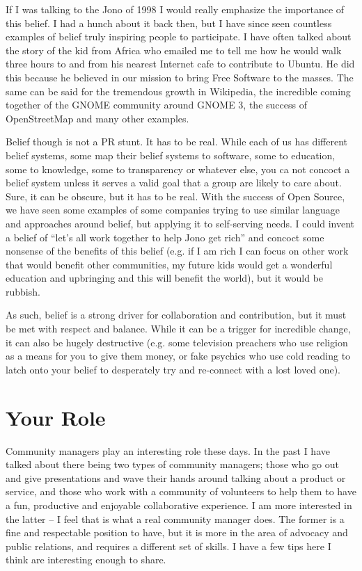 If I was talking to the Jono of 1998 I would really emphasize the importance of
this belief. I had a hunch about it back then, but I have since seen countless
examples of belief truly inspiring people to participate. I have often talked
about the story of the kid from Africa who emailed me to tell me how he would
walk three hours to and from his nearest Internet cafe to contribute to Ubuntu.
He did this because he believed in our mission to bring Free Software to the
masses. The same can be said for the tremendous growth in Wikipedia, the
incredible coming together of the GNOME community around GNOME 3, the success of
OpenStreetMap and many other examples.

Belief though is not a PR stunt. It has to be real. While each of us has
different belief systems, some map their belief systems to software, some to
education, some to knowledge, some to transparency or whatever else, you ca not
concoct a belief system unless it serves a valid goal that a group are likely to
care about. Sure, it can be obscure, but it has to be real. With the success of
Open Source, we have seen some examples of some companies trying to use similar
language and approaches around belief, but applying it to self-serving needs. I
could invent a belief of ``let’s all work together to help Jono get rich'' and
concoct some nonsense of the benefits of this belief (e.g. if I am rich I can
focus on other work that would benefit other communities, my future kids would
get a wonderful education and upbringing and this will benefit the world), but
it would be rubbish.

As such, belief is a strong driver for collaboration and contribution, but it
must be met with respect and balance. While it can be a trigger for incredible
change, it can also be hugely destructive (e.g. some television preachers who
use religion as a means for you to give them money, or fake psychics who use
cold reading to latch onto your belief to desperately try and re-connect with a
lost loved one).

\section*{Your Role}

Community managers play an interesting role these days. In the past I have
talked about there being two types of community managers; those who go out and
give presentations and wave their hands around talking about a product or
service, and those who work with a community of volunteers to help them to have
a fun, productive and enjoyable collaborative experience. I am more interested
in the latter -- I feel that is what a real community manager does. The former
is a fine and respectable position to have, but it is more in the area of
advocacy and public relations, and requires a different set of skills. I have a
few tips here I think are interesting enough to share.

